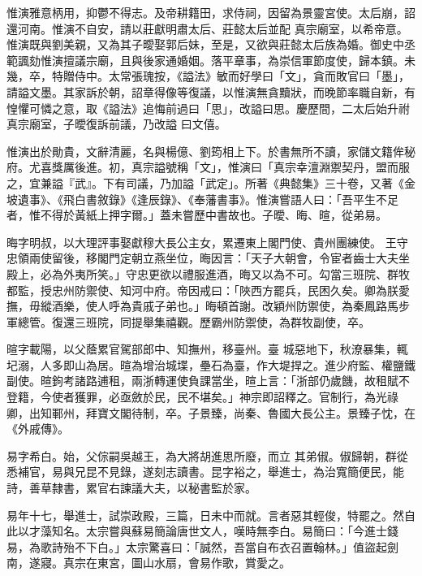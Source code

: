 \begin{pinyinscope}
 惟演雅意柄用，抑鬱不得志。及帝耕籍田，求侍祠，因留為景靈宮使。太后崩，詔還河南。惟演不自安，請以莊獻明肅太后、莊懿太后並配
 真宗廟室，以希帝意。惟演既與劉美親，又為其子曖娶郭后妹，至是，又欲與莊懿太后族為婚。御史中丞範諷劾惟演擅議宗廟，且與後家通婚姻。落平章事，為崇信軍節度使，歸本鎮。未幾，卒，特贈侍中。太常張瑰按，《謚法》敏而好學曰「文」，貪而敗官曰「墨」，請謚文墨。其家訴於朝，詔章得像等復議，以惟演無貪黷狀，而晚節率職自新，有惶懼可憐之意，取《謚法》追悔前過曰「思」，改謚曰思。慶歷間，二太后始升祔真宗廟室，子曖復訴前議，乃改謚
 曰文僖。



 惟演出於勛貴，文辭清麗，名與楊億、劉筠相上下。於書無所不讀，家儲文籍侔秘府。尤喜獎厲後進。初，真宗謚號稱「文」，惟演曰「真宗幸澶淵禦契丹，盟而服之，宜兼謚『武』。下有司議，乃加謚「武定」。所著《典懿集》三十卷，又著《金坡遺事》、《飛白書敘錄》《逢辰錄》、《奉藩書事》。惟演嘗語人曰：「吾平生不足者，惟不得於黃紙上押字爾。」蓋未嘗歷中書故也。子曖、晦、暄，從弟易。



 晦字明叔，以大理評事娶獻穆大長公主女，累遷東上閣門使、貴州團練使。
 王守忠領兩使留後，移閣門定朝立燕坐位，晦因言：「天子大朝會，令宦者齒士大夫坐殿上，必為外夷所笑。」守忠更欲以禮服進酒，晦又以為不可。勾當三班院、群牧都監，授忠州防禦使、知河中府。帝因戒曰：「陜西方罷兵，民困久矣。卿為朕愛撫，毋縱酒樂，使人呼為貴戚子弟也。」晦頓首謝。改穎州防禦使，為秦鳳路馬步軍總管。復還三班院，同提舉集禧觀。歷霸州防禦使，為群牧副使，卒。



 暄字載陽，以父蔭累官駕部郎中、知撫州，移臺州。臺
 城惡地下，秋潦暴集，輒圮溺，人多即山為居。暄為增治城堞，壘石為臺，作大堤捍之。進少府監、權鹽鐵副使。暄鉤考諸路逋租，兩浙轉運使負課當坐，暄上言：「浙部仍歲饑，故租賦不登籍，今使者獲罪，必亟斂於民，民不堪矣。」神宗即詔釋之。官制行，為光祿卿，出知鄆州，拜寶文閣待制，卒。子景臻，尚秦、魯國大長公主。景臻子忱，在《外戚傳》。



 易字希白。始，父倧嗣吳越王，為大將胡進思所廢，而立
 其弟俶。俶歸朝，群從悉補官，易與兄昆不見錄，遂刻志讀書。昆字裕之，舉進士，為治寬簡便民，能詩，善草隸書，累官右諫議大夫，以秘書監於家。



 易年十七，舉進士，試崇政殿，三篇，日未中而就。言者惡其輕俊，特罷之。然自此以才藻知名。太宗嘗與蘇易簡論唐世文人，嘆時無李白。易簡曰：「今進士錢易，為歌詩殆不下白。」太宗驚喜曰：「誠然，吾當自布衣召置翰林。」值盜起劍南，遂寢。真宗在東宮，圖山水扇，會易作歌，賞愛之。




\end{pinyinscope}
